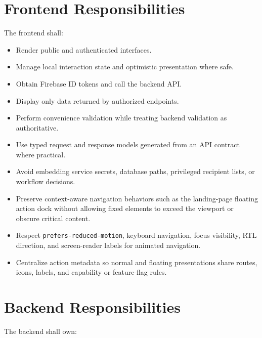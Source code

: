\documentclass[11pt,a4paper,oneside]{report}
\begin{document}
\section{Frontend Responsibilities}

The frontend shall:

\begin{itemize}
  \item Render public and authenticated interfaces.
  \item Manage local interaction state and optimistic presentation where safe.
  \item Obtain Firebase ID tokens and call the backend API.
  \item Display only data returned by authorized endpoints.
  \item Perform convenience validation while treating backend validation as authoritative.
  \item Use typed request and response models generated from an API contract where practical.
  \item Avoid embedding service secrets, database paths, privileged recipient lists, or workflow decisions.
  \item Preserve context-aware navigation behaviors such as the landing-page floating action dock without allowing fixed elements to exceed the viewport or obscure critical content.
  \item Respect \texttt{prefers-reduced-motion}, keyboard navigation, focus visibility, RTL direction, and screen-reader labels for animated navigation.
  \item Centralize action metadata so normal and floating presentations share routes, icons, labels, and capability or feature-flag rules.
\end{itemize}

\section{Backend Responsibilities}

The backend shall own:
\end{document}
